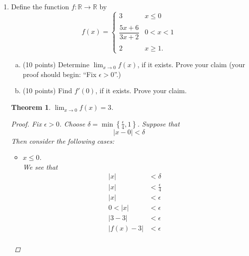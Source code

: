 \documentclass{amsart}
\newtheorem{theorem}{Theorem}
\begin{document}
\begin{enumerate}[1.]
    \newpage
    \item  Define the function $f: \mathbb{R} \to \mathbb{R}$ by
    \[ f(x) = \begin{cases} 3 & x \leq 0 \\
                              & \\
                            \dfrac{5x+6}{3x+2} & 0 < x < 1 \\
                              & \\
                            2 & x \geq 1.
                            \end{cases}\]
    \begin{enumerate}[(a)]
    \item (10 points) Determine $\displaystyle \lim_{x \to 0} f(x)$, if it exists. Prove your claim (your proof should begin: ``Fix $\epsilon >0$''.)
    \item (10 points) Find $f'(0)$, if it exists. Prove your claim.
    \end{enumerate}
    \begin{theorem}
        $\displaystyle \lim_{x \to 0} f(x) = 3$.
        \begin{proof}
            Fix $\epsilon > 0$. Choose $\displaystyle \delta = \min \left\{ \frac{\epsilon}{4}, 1 \right\}$. Suppose that 
            \[
                |x - 0| < \delta    
            \]
            Then consider the following cases:
            \begin{itemize}
                \item $x \leq 0$. \\
                We see that 
                \begin{align*}
                    |x| &< \delta \\
                    |x| &< \frac{\epsilon}{4} \\
                    |x| &< \epsilon \\
                    0 < |x| &< \epsilon \\
                    |3 - 3| &< \epsilon \\
                    |f(x) - 3| &< \epsilon \\
                \end{align*}


\end{itemize}
\end{proof}
\end{theorem}
\end{enumerate}
\end{document}

